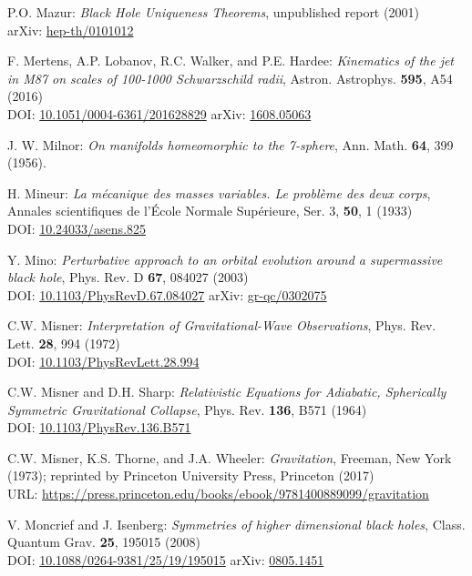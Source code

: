 \begin{thebibliography}{123}
P.O. Mazur:
{\em Black Hole Uniqueness Theorems},
unpublished report (2001)\\
arXiv: \href{https://arxiv.org/abs/hep-th/0101012}{hep-th/0101012}

F. Mertens, A.P. Lobanov, R.C. Walker, and P.E. Hardee:
{\em Kinematics of the jet in M87 on scales of 100-1000 Schwarzschild radii},
Astron. Astrophys. {\bf 595}, A54 (2016)\\
DOI: \href{https://doi.org/10.1051/0004-6361/201628829}{10.1051/0004-6361/201628829}\hfill
arXiv: \href{https://arxiv.org/abs/1608.05063}{1608.05063}

J. W. Milnor: {\em On manifolds homeomorphic to the 7-sphere},
Ann. Math. {\bf 64}, 399 (1956).

H. Mineur: {\em La mécanique des masses variables. Le problème des deux corps},
Annales scientifiques de l'École Normale Supérieure, Ser. 3, {\bf 50}, 1 (1933)\\
DOI: \href{https://doi.org/10.24033/asens.825}{10.24033/asens.825}

Y. Mino:
{\em Perturbative approach to an orbital evolution around a supermassive black hole},
Phys. Rev. D {\bf 67}, 084027 (2003)\\
DOI: \href{https://doi.org/10.1103/PhysRevD.67.084027}{10.1103/PhysRevD.67.084027}\hfill
arXiv: \href{https://arxiv.org/abs/gr-qc/0302075}{gr-qc/0302075}

C.W. Misner:
{\em Interpretation of Gravitational-Wave Observations},
Phys. Rev. Lett. {\bf 28}, 994 (1972)\\
DOI: \href{https://doi.org/10.1103/PhysRevLett.28.994}{10.1103/PhysRevLett.28.994}

C.W. Misner and D.H. Sharp:
{\em Relativistic Equations for Adiabatic, Spherically Symmetric Gravitational Collapse},
Phys. Rev. {\bf 136}, B571 (1964)\\
DOI: \href{https://doi.org/10.1103/PhysRev.136.B571}{10.1103/PhysRev.136.B571}

C.W. Misner, K.S. Thorne, and J.A. Wheeler:
{\em Gravitation},
Freeman, New York (1973);
reprinted by Princeton University Press, Princeton (2017)\\
URL: \url{https://press.princeton.edu/books/ebook/9781400889099/gravitation}

V. Moncrief and J. Isenberg:
{\em Symmetries of higher dimensional black holes},
Class. Quantum Grav. {\bf 25}, 195015 (2008)\\
DOI: \href{https://doi.org/10.1088/0264-9381/25/19/195015}{10.1088/0264-9381/25/19/195015}\hfill
arXiv: \href{https://arxiv.org/abs/0805.1451}{0805.1451}


\end{thebibliography}
